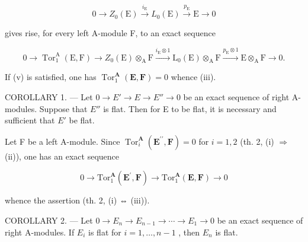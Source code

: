 \[
0 \longrightarrow Z _ {0} (\mathrm{E}) \stackrel {i _ {\mathrm{E}}} {\longrightarrow} L _ {0} (\mathrm{E}) \stackrel {p _ {\mathrm{E}}} {\longrightarrow} \mathrm{E} \longrightarrow 0
\]

gives rise, for every left A-module F, to an exact sequence

\[
0 \longrightarrow \operatorname{Tor} _ {1} ^ {\mathrm{A}} (\mathrm{E}, \mathrm{F}) \longrightarrow Z _ {0} (\mathrm{E}) \otimes_ {\mathrm{A}} \mathrm{F} \xrightarrow {i _ {\mathrm{E}} \otimes 1} \mathrm{L} _ {0} (\mathrm{E}) \otimes_ {\mathrm{A}} \mathrm{F} \xrightarrow {p _ {\mathrm{E}} \otimes 1} \mathrm{E} \otimes_ {\mathrm{A}} \mathrm{F} \longrightarrow 0.
\]

If (v) is satisfied, one has \(\operatorname{Tor}_1^{\mathbf{A}}(\mathbf{E},\mathbf{F}) = 0\) whence (iii).

COROLLARY 1. --- Let \(0 \to E' \to E \to E'' \to 0\) be an exact sequence of right A-modules. Suppose that \(E''\) is flat. Then for E to be flat, it is necessary and sufficient that \(E'\) be flat.

Let F be a left A-module. Since \(\operatorname{Tor}_i^{\mathbf{A}}(\mathbf{E}^{\prime \prime},\mathbf{F}) = 0\) for \(i = 1,2\) (th. 2, (i) \(\Rightarrow\) (ii)), one has an exact sequence

\[
0 \to \mathrm{Tor} _ {1} ^ {\mathbf {A}} (\mathbf {E} ^ {\prime}, \mathbf {F}) \to \mathrm{Tor} _ {1} ^ {\mathbf {A}} (\mathbf {E}, \mathbf {F}) \to 0
\]

whence the assertion (th. 2, (i) ⇔ (iii)).

COROLLARY 2. --- Let \(0 \to E_n \to E_{n-1} \to \cdots \to E_1 \to 0\) be an exact sequence of right A-modules. If \(E_i\) is flat for \(i = 1, \ldots, n-1\) , then \(E_n\) is flat.
\relax{}
